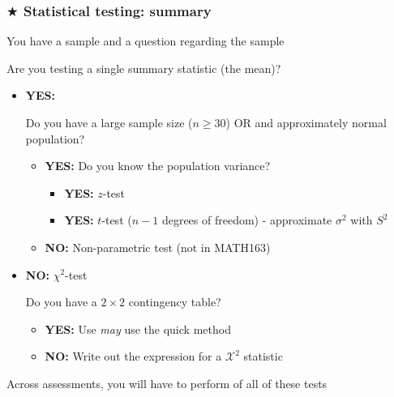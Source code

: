 \documentclass[t,8pt]{beamer}%
\begin{document}
\begin{frame}
	\frametitle{$\bigstar$ Statistical testing: summary} 
	You have a sample and a question regarding the sample \par
	Are you testing a single summary statistic (the mean)?
	\begin{itemize}
		\item {\bf YES:} \par
            Do you have a large sample size ($n\geq 30$) OR and approximately normal population?
		\begin{itemize}
			\item {\bf YES:} 
                    Do you know the population variance?
                    \begin{itemize}
                        \item {\bf YES:} $z$-test
                        \item {\bf YES:} $t$-test ($n-1$ degrees of freedom) - approximate $\sigma^2$ with $S^2$
                    \end{itemize}
			\item {\bf NO:} Non-parametric test (not in MATH163)
		\end{itemize}
		\item {\bf NO:} $\chi^2$-test\par
		Do you have a $2\times 2$ contingency table?
		\begin{itemize}
			\item {\bf YES:} Use {\it may} use the quick method
			\item {\bf NO:} Write out the expression for a $\mathcal{X}^2$ statistic
		\end{itemize}
	\end{itemize}
	Across assessments, you will have to perform of all of these tests \par
\end{frame}

\end{document}
